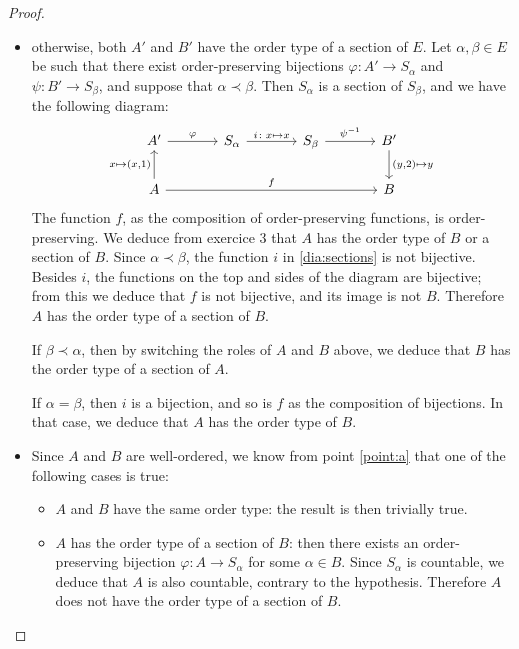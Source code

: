 \documentclass[11pt,a4paper,twoside]{article}
\theoremstyle{definition}
\begin{document}
\begin{proof}
\begin{enumerate}[(a)]
\begin{itemize}
      \item otherwise, both $A'$ and $B'$ have the order type of a section of $E$. Let $\alpha, \beta \in E$ be such that
        there exist order-preserving bijections $\varphi : A' \to S_\alpha$ and $\psi : B' \to S_\beta$, and suppose that $\alpha \prec \beta$.
        Then $S_\alpha$ is a section of $S_\beta$, and we have the following diagram:
        \begin{equation}\label{dia:sections}
          \begin{tikzcd}[column sep = large]
            A'
               \arrow{r}{\varphi}
            & S_\alpha
               \arrow{r}{i \colon x \mapsto x}
            & S_\beta
               \arrow{r}{\psi^{-1}}
            & B'
               \arrow{d}{( y, 2 ) \mapsto y} \\
            A
               \arrow{u}{x \mapsto ( x, 1 )}
               \arrow[to = 2-4, "f"]
            & & & B
          \end{tikzcd}
        \end{equation}
        The function $f$, as the composition of order-preserving functions, is order-preserving. We deduce from exercice 3
        that $A$ has the order type of $B$ or a section of $B$. Since $\alpha \prec \beta$, the function $i$ in \eqref{dia:sections}
        is not bijective. Besides $i$, the functions on the top and sides of the diagram are bijective; from this we deduce that
        $f$ is not bijective, and its image is not $B$. Therefore $A$ has the order type of a section of $B$.

        If $\beta \prec \alpha$, then by switching the roles of $A$ and $B$ above, we deduce that $B$ has the order type of
        a section of $A$.

        If $\alpha = \beta$, then $i$ is a bijection, and so is $f$ as the composition of bijections. In that case, we deduce
        that $A$ has the order type of $B$.

      \item Since $A$ and $B$ are well-ordered, we know from point \ref{point:a} that one of the following cases is true:
        \begin{itemize}

          \item $A$ and $B$ have the same order type: the result is then trivially true.

          \item $A$ has the order type of a section of $B$: then there exists an order-preserving bijection $\varphi \colon A \to S_\alpha$
            for some $\alpha \in B$. Since $S_\alpha$ is countable, we deduce that $A$ is also countable, contrary to the hypothesis.
            Therefore $A$ does not have the order type of a section of $B$.


\end{itemize}
\end{itemize}
\end{enumerate}
\end{proof}
\end{document}
